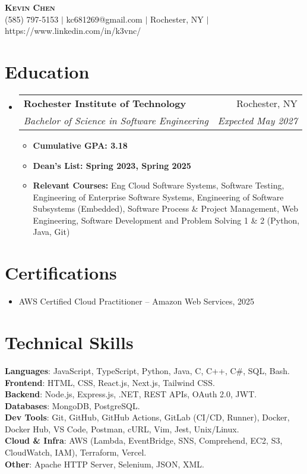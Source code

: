 \documentclass[letterpaper,11pt]{article}
\makeatletter
\newcommand{\resumeItem}[1]{
  \item\small{
    {#1 \vspace{-2pt}}
  }
}
\newcommand{\resumeSubheading}[4]{
  \vspace{-2pt}\item
    \begin{tabular*}{0.97\textwidth}[t]{l@{\extracolsep{\fill}}r}
      \textbf{#1} & #2 \\
      \textit{\small#3} & \textit{\small #4} \\
    \end{tabular*}\vspace{-7pt}
}
\newcommand{\resumeSubHeadingListStart}{\begin{itemize}[leftmargin=0.15in, label={}]}
\newcommand{\resumeSubHeadingListEnd}{\end{itemize}}
\newcommand{\resumeItemListStart}{\begin{itemize}}
\newcommand{\resumeItemListEnd}{\end{itemize}\vspace{-5pt}}
\makeatother
\begin{document}
\begin{center}
    \textbf{\Huge \scshape Kevin Chen} \\ \vspace{1pt}
    \small (585) 797-5153 $|$ kc681269@gmail.com $|$ Rochester, NY $|$ 
    https://www.linkedin.com/in/k3vnc/ 
\end{center}

\section{Education}
  \resumeSubHeadingListStart
    \resumeSubheading
      {Rochester Institute of Technology}{Rochester, NY}
      {Bachelor of Science in Software Engineering}{Expected May 2027}
      \resumeItemListStart
        \resumeItem{\textbf{Cumulative GPA: 3.18}}
        \resumeItem{\textbf{Dean's List: Spring 2023, Spring 2025}}
        \resumeItem{\textbf{Relevant Courses:} Eng Cloud Software Systems, Software Testing, Engineering of Enterprise Software Systems, Engineering of Software Subsystems (Embedded), Software Process \& Project Management, Web Engineering, Software Development and Problem Solving 1 \& 2 (Python, Java, Git)}
      \resumeItemListEnd
  \resumeSubHeadingListEnd

\section{Certifications}
  \resumeSubHeadingListStart
    \resumeItem{AWS Certified Cloud Practitioner -- Amazon Web Services, 2025}
  \resumeSubHeadingListEnd

\section{Technical Skills}
\begin{itemize}[leftmargin=0.15in, label={}]
\small{\item{
\textbf{Languages}{: JavaScript, TypeScript, Python, Java, C, C++, C\#, SQL, Bash.} \\
\textbf{Frontend}{: HTML, CSS, React.js, Next.js, Tailwind CSS.} \\
\textbf{Backend}{: Node.js, Express.js, .NET, REST APIs, OAuth 2.0, JWT.} \\
\textbf{Databases}{: MongoDB, PostgreSQL.} \\
\textbf{Dev Tools}{: Git, GitHub, GitHub Actions, GitLab (CI/CD, Runner), Docker, Docker Hub, VS Code, Postman, cURL, Vim, Jest, Unix/Linux.} \\
\textbf{Cloud \& Infra}{: AWS (Lambda, EventBridge, SNS, Comprehend, EC2, S3, CloudWatch, IAM), Terraform, Vercel.} \\
\textbf{Other}{: Apache HTTP Server, Selenium, JSON, XML.}}}
\end{itemize}
\end{document}
